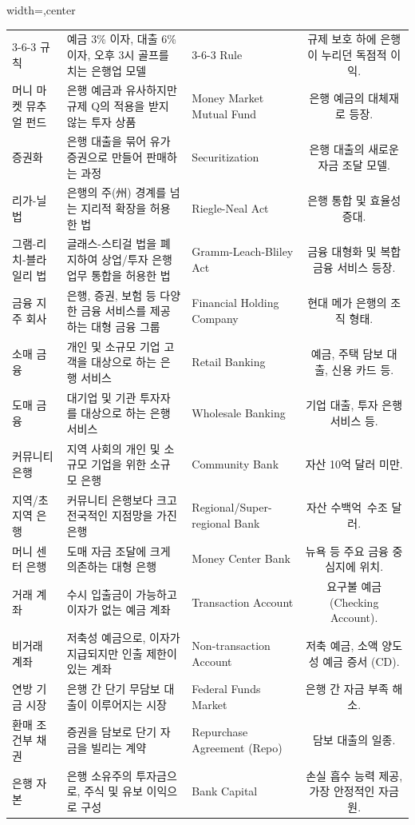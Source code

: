 \documentclass[11pt,a4paper]{book}
\theoremstyle{definition}
\begin{document}
\begin{adjustbox}{width=\textwidth,center}
\begin{tabular}{lllc}
3-6-3 규칙 & 예금 3\% 이자, 대출 6\% 이자, 오후 3시 골프를 치는 은행업 모델 & 3-6-3 Rule & 규제 보호 하에 은행이 누리던 독점적 이익. \\
머니 마켓 뮤추얼 펀드 & 은행 예금과 유사하지만 규제 Q의 적용을 받지 않는 투자 상품 & Money Market Mutual Fund & 은행 예금의 대체재로 등장. \\
증권화 & 은행 대출을 묶어 유가증권으로 만들어 판매하는 과정 & Securitization & 은행 대출의 새로운 자금 조달 모델. \\
리가-닐 법 & 은행의 주(州) 경계를 넘는 지리적 확장을 허용한 법 & Riegle-Neal Act & 은행 통합 및 효율성 증대. \\
그램-리치-블라일리 법 & 글래스-스티걸 법을 폐지하여 상업/투자 은행 업무 통합을 허용한 법 & Gramm-Leach-Bliley Act & 금융 대형화 및 복합 금융 서비스 등장. \\
금융 지주 회사 & 은행, 증권, 보험 등 다양한 금융 서비스를 제공하는 대형 금융 그룹 & Financial Holding Company & 현대 메가 은행의 조직 형태. \\
소매 금융 & 개인 및 소규모 기업 고객을 대상으로 하는 은행 서비스 & Retail Banking & 예금, 주택 담보 대출, 신용 카드 등. \\
도매 금융 & 대기업 및 기관 투자자를 대상으로 하는 은행 서비스 & Wholesale Banking & 기업 대출, 투자 은행 서비스 등. \\
커뮤니티 은행 & 지역 사회의 개인 및 소규모 기업을 위한 소규모 은행 & Community Bank & 자산 10억 달러 미만. \\
지역/초지역 은행 & 커뮤니티 은행보다 크고 전국적인 지점망을 가진 은행 & Regional/Super-regional Bank & 자산 수백억~수조 달러. \\
머니 센터 은행 & 도매 자금 조달에 크게 의존하는 대형 은행 & Money Center Bank & 뉴욕 등 주요 금융 중심지에 위치. \\
거래 계좌 & 수시 입출금이 가능하고 이자가 없는 예금 계좌 & Transaction Account & 요구불 예금 (Checking Account). \\
비거래 계좌 & 저축성 예금으로, 이자가 지급되지만 인출 제한이 있는 계좌 & Non-transaction Account & 저축 예금, 소액 양도성 예금 증서 (CD). \\
연방 기금 시장 & 은행 간 단기 무담보 대출이 이루어지는 시장 & Federal Funds Market & 은행 간 자금 부족 해소. \\
환매 조건부 채권 & 증권을 담보로 단기 자금을 빌리는 계약 & Repurchase Agreement (Repo) & 담보 대출의 일종. \\
은행 자본 & 은행 소유주의 투자금으로, 주식 및 유보 이익으로 구성 & Bank Capital & 손실 흡수 능력 제공, 가장 안정적인 자금원. \\

\end{tabular}
\end{adjustbox}
\end{document}
